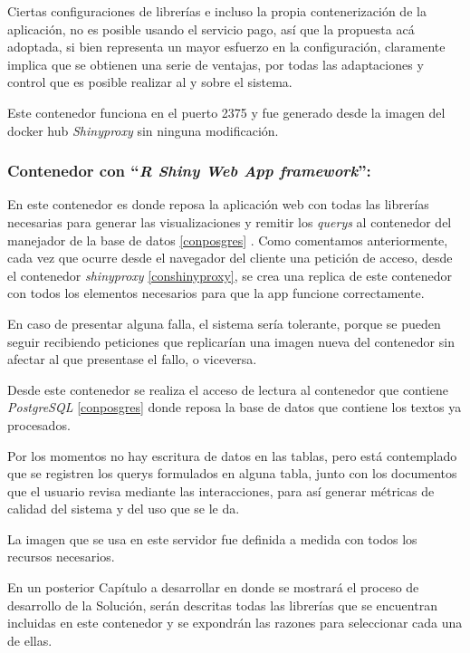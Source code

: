 \documentclass[
  10,
  openany]{book}
\begin{document}
Ciertas configuraciones de librerías e incluso la propia contenerización de la aplicación, no es posible usando el servicio pago, así que la propuesta acá adoptada, si bien representa un mayor esfuerzo en la configuración, claramente implica que se obtienen una serie de ventajas, por todas las adaptaciones y control que es posible realizar al y sobre el sistema.

Este contenedor funciona en el puerto 2375 y fue generado desde la imagen del docker hub \emph{Shinyproxy} sin ninguna modificación.

\hypertarget{conshiny}{%
\subsubsection{\texorpdfstring{Contenedor con ``\emph{R Shiny Web App framework}'':}{Contenedor con ``R Shiny Web App framework'':}}\label{conshiny}}

En este contenedor es donde reposa la aplicación web con todas las librerías necesarias para generar las visualizaciones y remitir los \emph{querys} al contenedor del manejador de la base de datos \ref{conposgres} . Como comentamos anteriormente, cada vez que ocurre desde el navegador del cliente una petición de acceso, desde el contenedor \emph{shinyproxy} \ref{conshinyproxy}, se crea una replica de este contenedor con todos los elementos necesarios para que la app funcione correctamente.

En caso de presentar alguna falla, el sistema sería tolerante, porque se pueden seguir recibiendo peticiones que replicarían una imagen nueva del contenedor sin afectar al que presentase el fallo, o viceversa.

Desde este contenedor se realiza el acceso de lectura al contenedor que contiene \emph{PostgreSQL} \ref{conposgres} donde reposa la base de datos que contiene los textos ya procesados.

Por los momentos no hay escritura de datos en las tablas, pero está contemplado que se registren los querys formulados en alguna tabla, junto con los documentos que el usuario revisa mediante las interacciones, para así generar métricas de calidad del sistema y del uso que se le da.

La imagen que se usa en este servidor fue definida a medida con todos los recursos necesarios.

En un posterior Capítulo a desarrollar en donde se mostrará el proceso de desarrollo de la Solución, serán descritas todas las librerías que se encuentran incluidas en este contenedor y se expondrán las razones para seleccionar cada una de ellas.
\end{document}
